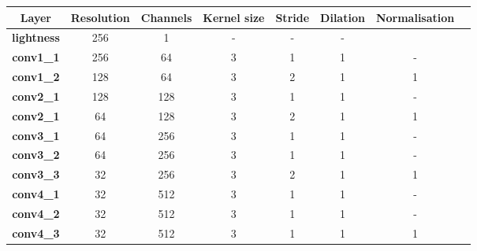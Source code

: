 \documentclass{article}
\begin{document}
\begin{table}
    \centering
    \begin{tabular}{|c|c|c|c|c|c|c|c|}
        \hline
        \textbf{Layer}        & \textbf{Resolution} & \textbf{Channels} & \textbf{Kernel size} & \textbf{Stride} & {\textbf{Dilation}} & \textbf{Normalisation} \\
        \hline
        \textbf{lightness}    & 256                 & 1                 & -                    & -               & -                   &                        \\ \hline
        \textbf{conv1\_1}     & 256                 & 64                & 3                    & 1               & 1                   & -                      \\
        \textbf{conv1\_2}     & 128                 & 64                & 3                    & 2               & 1                   & 1                      \\ \hline
        \textbf{conv2\_1}     & 128                 & 128               & 3                    & 1               & 1                   & -                      \\
        \textbf{conv2\_1}     & 64                  & 128               & 3                    & 2               & 1                   & 1                      \\ \hline
        \textbf{conv3\_1}     & 64                  & 256               & 3                    & 1               & 1                   & -                      \\
        \textbf{conv3\_2}     & 64                  & 256               & 3                    & 1               & 1                   & -                      \\
        \textbf{conv3\_3}     & 32                  & 256               & 3                    & 2               & 1                   & 1                      \\ \hline
        \textbf{conv4\_1}     & 32                  & 512               & 3                    & 1               & 1                   & -                      \\
        \textbf{conv4\_2}     & 32                  & 512               & 3                    & 1               & 1                   & -                      \\
        \textbf{conv4\_3}     & 32                  & 512               & 3                    & 1               & 1                   & 1                      \\ \hline

\end{tabular}
\end{table}
\end{document}
